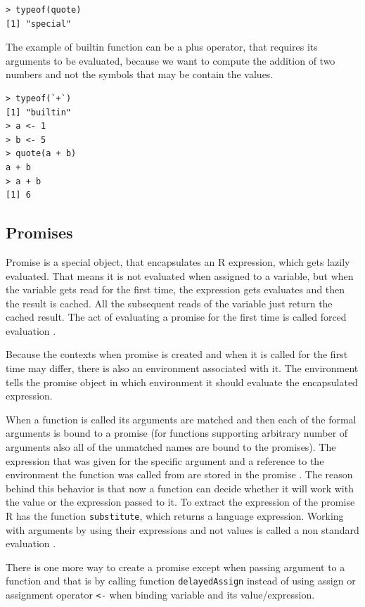 \documentclass[thesis=B,english]{FITthesis}[2012/10/20]
\begin{document}
\begin{verbatim}
> typeof(quote)
[1] "special" 
\end{verbatim}

The example of builtin function can be a plus operator, that requires its arguments to be evaluated, because we want to compute the addition of two numbers and not the symbols that may be contain the values.

\begin{verbatim}
> typeof(`+`)
[1] "builtin" 
> a <- 1
> b <- 5
> quote(a + b)
a + b
> a + b
[1] 6 
\end{verbatim}

\subsection{Promises}
Promise is a special object, that encapsulates an R expression, which gets lazily evaluated. That means it is not evaluated when assigned to a variable, but when the variable gets read for the first time, the expression gets evaluates and then the result is cached. All the subsequent reads of the variable just return the cached result. The act of evaluating a promise for the first time is called forced evaluation \cite{specs}. 

Because the contexts when promise is created and when it is called for the first time may differ, there is also an environment associated with it. The environment tells the promise object in which environment it should evaluate the encapsulated expression.

When a function is called its arguments are matched and then each of the formal arguments is bound to a promise (for functions supporting arbitrary number of arguments also all of the unmatched names are bound to the promises). The expression that was given for the specific argument and a reference to the environment the function was called from are stored in the promise \cite{specs}. The reason behind this behavior is that now a function can decide whether it will work with the value or the expression passed to it. To extract the expression of the promise R has the function \verb|substitute|, which returns a language expression. Working with arguments by using their expressions and not values is called a non standard evaluation \cite{advR}.

There is one more way to create a promise except when passing argument to a function and that is by calling function \verb|delayedAssign| instead of using assign or assignment operator \verb|<-| when binding variable and its value/expression.
\end{document}
